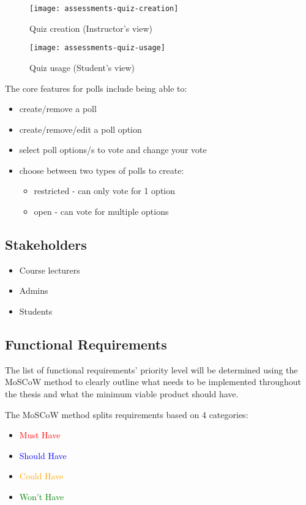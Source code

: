\begin{figure}[h!]
	\centering
	\texttt{[image: assessments-quiz-creation]}
	\caption{Quiz creation (Instructor's view)}
\end{figure}

\begin{figure}[h!]
\centering
\texttt{[image: assessments-quiz-usage]}
\caption{Quiz usage (Student's view)}
\end{figure}

The core features for polls include being able to:
\begin{itemize}
	\item create/remove a poll
	\item create/remove/edit a poll option
	\item select poll options/s to vote and change your vote
	\item choose between two types of polls to create:
		\begin{itemize}
			\item restricted - can only vote for 1 option
			\item open - can vote for multiple options
		\end{itemize}
\end{itemize}


\subsection{Stakeholders}
\begin{itemize}
	\item Course lecturers
	\item Admins
	\item Students
\end{itemize}

\subsection{Functional Requirements}
The list of functional requirements' priority level will be determined using the MoSCoW method to clearly outline what needs to be implemented throughout the thesis and what the minimum viable product should have. 

The MoSCoW method splits requirements based on 4 categories:
\begin{itemize}
	\item \textcolor{Red}{Must Have}
	\item \textcolor{Blue}{Should Have}
	\item \textcolor{Orange}{Could Have}
	\item \textcolor{Green}{Won't Have}
\end{itemize}

